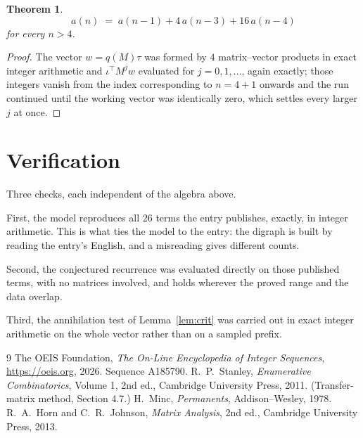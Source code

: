 \documentclass[11pt,a4paper]{article}
\theoremstyle{plain}
\newtheorem{theorem}{Theorem}
\theoremstyle{definition}
\begin{document}
\begin{theorem}
\[
a(n)\;=\;a(n-1) + 4\,a(n-3) + 16\,a(n-4)
\]
for every $n>4$.
\end{theorem}

\begin{proof}
The vector $w=q(M)\tau$ was formed by $4$ matrix--vector products in exact integer
arithmetic and $\iota^{\!\top}M^{j}w$ evaluated for $j=0,1,\dots$, again exactly; those
integers vanish from the index corresponding to $n=4+1$ onwards and the run continued
until the working vector was identically zero, which settles every larger $j$ at once.
\end{proof}

\section{Verification}

Three checks, each independent of the algebra above.

First, the model reproduces all $26$ terms the entry publishes, exactly, in integer
arithmetic. This is what ties the model to the entry: the digraph is built by reading the
entry's English, and a misreading gives different counts.

Second, the conjectured recurrence was evaluated directly on those published terms, with no
matrices involved, and holds wherever the proved range and the data overlap.

Third, the annihilation test of Lemma~\ref{lem:crit} was carried out in exact integer
arithmetic on the whole vector rather than on a sampled prefix.

\begin{thebibliography}{9}
 The OEIS Foundation, \emph{The On-Line Encyclopedia of Integer
Sequences}, \url{https://oeis.org}, 2026. Sequence A185790.
 R.~P.~Stanley, \emph{Enumerative Combinatorics}, Volume 1, 2nd ed.,
Cambridge University Press, 2011. (Transfer-matrix method, Section 4.7.)
 H.~Minc, \emph{Permanents}, Addison--Wesley, 1978.
 R.~A.~Horn and C.~R.~Johnson, \emph{Matrix Analysis}, 2nd ed., Cambridge
University Press, 2013.
\end{thebibliography}
\end{document}
